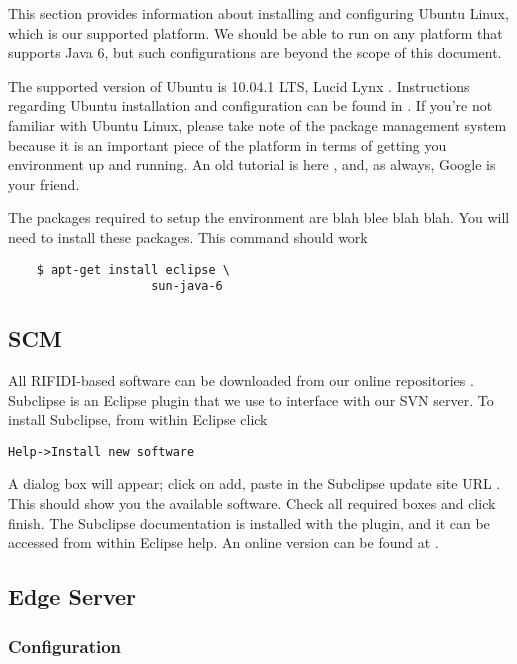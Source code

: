 \documentclass[11pt]{article}
\begin{document}
This section provides information about installing and configuring Ubuntu Linux, which is our supported platform.  We should be able to run on any platform that supports Java 6, but such configurations are beyond the scope of this document.

The supported version of Ubuntu is 10.04.1 LTS, Lucid Lynx \cite{ubuntu, lucid}.  Instructions regarding Ubuntu installation and configuration can be found in \cite{lucid-doc}.  If you're not familiar with Ubuntu Linux, please take note of the package management system because it is an important piece of the platform in terms of getting you environment up and running.  An old tutorial is here \cite{apt-get-tut}, and, as always, Google is your friend.

The packages required to setup the environment are blah blee blah blah.  You will need to install these packages.  This command should work
\begin{verbatim}
	$ apt-get install eclipse \
					sun-java-6
\end{verbatim}

\subsection{SCM}

All RIFIDI-based software can be downloaded from our online repositories \cite{rep-edge, rep-external, rep-internal, rep-ambient}.  Subclipse \cite{subclipse} is an Eclipse plugin that we use to interface with our SVN server.  To install Subclipse, from within Eclipse click \begin{verbatim}Help->Install new software\end{verbatim} 

A dialog box will appear; click on add, paste in the Subclipse update site URL \cite{subclipse-update}.  This should show you the available software.  Check all required boxes and click finish.  The Subclipse documentation is installed with the plugin, and it can be accessed from within Eclipse help.  An online version can be found at \cite{subclipse-doc}.

 \subsection{Edge Server}
\subsubsection{ Configuration}
\end{document}
